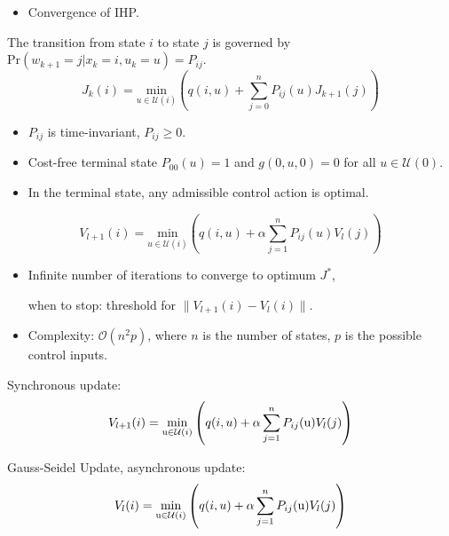 \documentclass[landscape,a0paper,fontscale=0.285]{baposter} %
\newcommand{\compresslist}{ %
\setlength{\itemsep}{1pt}
\setlength{\parskip}{0pt}
\setlength{\parsep}{0pt}
}
\begin{document}
\begin{poster}
{\vspace{-0.5cm}
\begin{itemize}
  \item Convergence of IHP.
\end{itemize}

\colorbox[HTML]{CCFFFF}{}
The transition from state \(i\) to state \(j\) is governed by \(\text{Pr}(w_{k+1}=j|x_k=i,u_k=u) = P_{ij}\).\vspace{-0.3cm}
$$
J_k(i) = \underset{u \in \mathcal{U}(i)}{\text{min}} \left(q(i,u) + \sum_{j=0}^n P_{ij}(u)J_{k+1}(j)\right)
$$
\vspace{-1cm}
\begin{itemize}\compresslist
  \item \(P_{ij}\) is time-invariant, \(P_{ij} \ge 0\).
  \item Cost-free terminal state \(P_{00}(u) = 1\) and \(g(0,u,0) = 0\) for all \(u \in \mathcal{U}(0)\).
  \item In the terminal state, any admissible control action is optimal.
\end{itemize}

\colorbox[HTML]{CCFFFF}{}\vspace{-0.3cm}
$$
V_{l+1}(i) = \underset{u \in \mathcal{U}(i)}{\text{min}} \left(q(i,u) + \alpha \sum_{j=1}^n P_{ij}(u)V_l(j)\right)
$$

\begin{itemize}\compresslist
  \item Infinite number of iterations to converge to optimum \(J^*\),
  
  when to stop: threshold for \(\|V_{l+1}(i) - V_l(i)\|\).
  \item Complexity: \(\mathcal{O}(n^2p)\), where \(n\) is the number of states, \(p\) is the possible control inputs.
\end{itemize}

\begin{minipage}{0.5\textwidth}
    Synchronous update:\vspace{-0.3cm}
    $$
    V_{l+1}(i) = \underset{\text u\in \mathcal U(i)}{\text{min}}\left(q(i,u)  + \alpha\sum_{j=1}^n P_{ij}(\text u)V_l(j)\right)
    $$
\end{minipage}
\hfill
\begin{minipage}{0.475\textwidth}
    Gauss-Seidel Update, asynchronous update:\vspace{-0.3cm}
    $$
    V_{l}(i) = \underset{\text u\in \mathcal U(i)}{\text{min}}\left(q(i,u)  + \alpha\sum_{j=1}^n P_{ij}(\text u)V_l(j)\right)
    $$
\end{minipage}

}
\end{poster}
\end{document}
